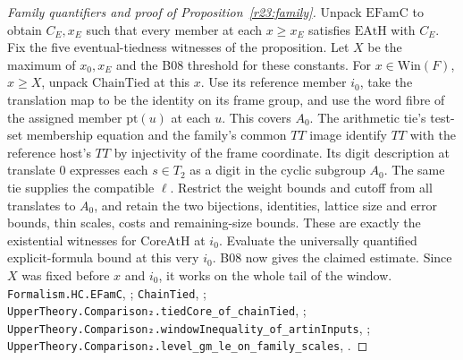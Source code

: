 \begin{proof}[Family quantifiers and proof of Proposition~\ref{r23:family}]
Unpack $\mathrm{EFamC}$ to obtain $C_E,x_E$ such that every member at
each $x\ge x_E$ satisfies $\mathrm{EAtH}$ with $C_E$. Fix the five
eventual-tiedness witnesses of the proposition. Let $X$ be the maximum
of $x_0,x_E$ and the B08 threshold for these constants. For $x\in
\mathrm{Win}(F)$, $x\ge X$, unpack $\mathrm{ChainTied}$ at this $x$.
Use its reference member $i_0$, take the translation map to be the identity
on its frame group, and use the word fibre of the assigned member
$\mathrm{pt}(u)$ at each $u$. This covers $A_0$. The arithmetic tie's
test-set membership equation and the family's common $TT$ image identify
$TT$ with the reference host's $TT$ by injectivity of the frame coordinate.
Its digit description at translate $0$ expresses each $s\in T_2$ as a digit
in the cyclic subgroup $A_0$. The same tie supplies the compatible
$\ell$. Restrict the weight bounds and cutoff from all translates to
$A_0$, and retain the two bijections, identities, lattice size and error
bounds, thin scales, costs and remaining-size bounds. These are exactly
the existential witnesses for $\mathrm{CoreAtH}$ at $i_0$.
Evaluate the universally quantified explicit-formula bound at this very
$i_0$. B08 now gives the claimed estimate. Since $X$ was fixed before
$x$ and $i_0$, it works on the whole tail of the window.
\nolinkurl{Formalism.HC.EFamC}, ;
\nolinkurl{ChainTied}, ;
\nolinkurl{UpperTheory.Comparison₂.tiedCore_of_chainTied},
;
\nolinkurl{UpperTheory.Comparison₂.windowInequality_of_artinInputs},
;
\nolinkurl{UpperTheory.Comparison₂.level_gm_le_on_family_scales},
.
\end{proof}

